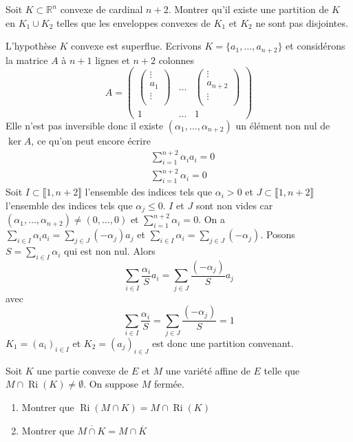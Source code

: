 \documentclass{fancybook}
\DeclareMathOperator{\Ri}{Ri}
\begin{document}
\begin{exercice}
Soit $K\subset \mathbb R^n$ convexe de cardinal $n+2$. Montrer qu'il existe une partition de $K$ en $K_1 \cup K_2$ telles que les enveloppes convexes de $K_1$ et $K_2$ ne sont pas disjointes.
\end{exercice}
L'hypothèse $K$ convexe est superflue. Ecrivons $K=\{a_1,\ldots, a_{n+2}\}$ et considérons la matrice $A$ à $n+1$ lignes et $n+2$ colonnes 
$$A=\begin{pmatrix}
\begin{pmatrix}
\vdots \\
a_1\\
\vdots\\
\end{pmatrix} & \hdots & \begin{pmatrix}
\vdots \\
a_{n+2}\\
\vdots\\
\end{pmatrix} \\
1 & \hdots & 1
\end{pmatrix}$$
Elle n'est pas inversible donc il existe $(\alpha_1,\ldots,\alpha_{n+2})$ un élément non nul de $\ker A$, ce qu'on peut encore écrire $$\begin{aligned} &\sum_{i=1}^{n+2} \alpha_i a_i =0 \\
&\sum_{i=1}^{n+2} \alpha_i =0 \end{aligned}$$
Soit $I\subset \llbracket 1,n+2 \rrbracket$ l'ensemble des indices tels que $\alpha_i>0$ et $J\subset \llbracket 1,n+2 \rrbracket$ l'ensemble des indices tels que $\alpha_j\leq 0$. $I$ et $J$ sont non vides car $(\alpha_1,\ldots,\alpha_{n+2})\neq (0,\ldots,0)$ et $\sum_{i=1}^{n+2} \alpha_i =0$.\newline \newline
On a $\sum_{i\in I} \alpha_i a_i = \sum_{j\in J} (-\alpha_j)a_j$ et $\sum_{i\in I} \alpha_i = \sum_{j\in J} (-\alpha_j)$.\newline \newline
Posons $S=\sum_{i\in I} \alpha_i$ qui est non nul. Alors 
$$\sum_{i\in I} \dfrac{\alpha_i}{S} a_i = \sum_{j\in J} \dfrac{(-\alpha_j)}{S} a_j$$
 avec $$ \sum_{i\in I} \dfrac{\alpha_i}{S} = \sum_{j\in J} \dfrac{(-\alpha_j)}{S}=1$$
$K_1=(a_i)_{i\in I}$ et $K_2=(a_j)_{i\in J}$ est donc une partition convenant.

\begin{exercice}
Soit $K$ une partie convexe de $E$ et $M$ une variété affine de $E$ telle que $M\cap \Ri(K) \neq \emptyset$. On suppose $M$ fermée.
\begin{enumerate}
\item Montrer que $\Ri(M\cap K) = M\cap \Ri(K)$
\item Montrer  que $\overline{M\cap K}=M\cap \overline K$
\end{enumerate}
\end{exercice}
\end{document}

